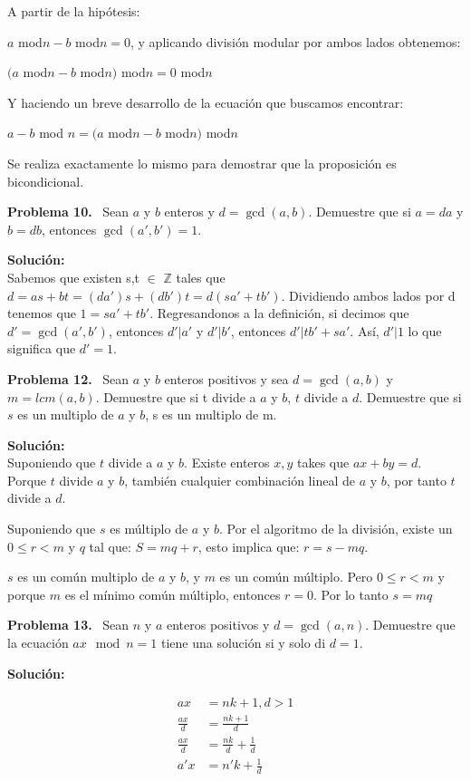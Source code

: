 \documentclass{article}
\newcounter{problem}
\newcounter{solution}
\newcommand\Problem[1]{%
  \stepcounter{problem}%
  \textbf{Problema #1.}~%
  \setcounter{solution}{0}%
}
\newcommand\TheSolution{%
  \textbf{Solución:}\\%
}
\begin{document}
A partir de la hip\'otesis: 

$a$ mod$n-b$ mod$n=0$, y aplicando divisi\'on modular por ambos lados
obtenemos:

$(a$ mod$n-b$ mod$n)$ mod$n=0$ mod$n$

Y haciendo un breve desarrollo de la ecuaci\'on que buscamos encontrar:

$a-b$ mod $n=(a$ mod$n-b$ mod$n)$ mod$n$

Se realiza exactamente lo mismo para demostrar que la proposici\'on es
bicondicional.

\Problem{10} Sean $a$ y $b$ enteros y $d = \gcd(a, b)$. Demuestre que si $a =
da$ y $b = db$, entonces $\gcd(a', b') = 1$.

\TheSolution{}
Sabemos que existen s,t $\in$ $\mathbb{Z}$ tales que $d = as + bt = (da')s +
(db')t = d(sa' + 	tb')$. Dividiendo ambos lados por d tenemos que $1 = sa' +
tb'$. Regresandonos a la definici\'on, si decimos que $d' = \gcd(a', b')$,
entonces $d' | a'$ y $d' | b'$, entonces $d' | tb' + sa'$. Así, $d' | 1$ lo
que significa que $d' = 1$.


\Problem{12} Sean $a$ y $b$ enteros positivos y sea $d = \gcd(a, b)$ y
$m = lcm(a, b)$. Demuestre que si t divide a $a$ y $b$, $t$ divide a $d$.
Demuestre que si $s$ es un multiplo de $a$ y $b$, s es un multiplo de m.

\TheSolution

Suponiendo que $t$ divide a $a$ y $b$. Existe enteros $x,y$ takes que $ax + by
= d$. Porque $t$ divide $a$  y $b$, tambi\'en cualquier combinaci\'on lineal
de $a$ y $b$, por tanto $t$ divide a $d$.

Suponiendo que $s$ es m\'ultiplo de $a$ y $b$. Por el algoritmo de la
divisi\'on, existe un $0\leq r < m$ y $q$ tal que: $S=mq + r$, esto implica
que: $r=s-mq$.

$s$ es un común multiplo de $a$ y $b$, y $m$ es un común múltiplo. Pero
$0 \leq r < m$ y porque $m$ es el mínimo  común múltiplo, entonces
$r=0$. Por lo tanto $s=mq$ 

\Problem{13} Sean $n$ y $a$ enteros positivos y $d = \gcd(a, n)$. Demuestre
que la ecuación $ax \mod n = 1$ tiene una solución si y solo di $d = 1$.

\TheSolution{}

\[
\begin{align}
  ax &= nk + 1, d > 1 \\
  \frac{ax}{d} &= \frac{nk + 1}{d} \\
  \frac{ax}{d} &= \frac{nk}{d} + \frac{1}{d} \\
  a'x &= n'k + \frac{1}{d} 
\end{align}
\]
\end{document}
